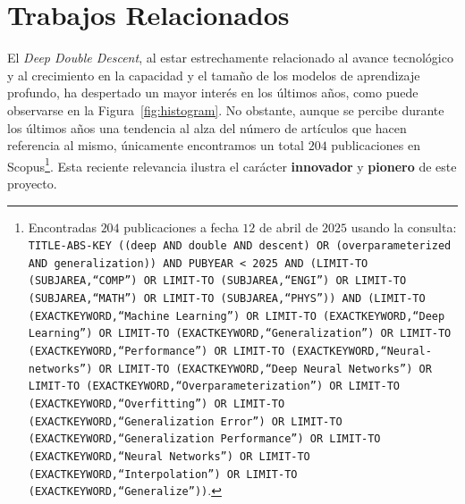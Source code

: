 
\chapter{Trabajos Relacionados}\label{sec:evolucion-ddd}

El \emph{Deep Double Descent}, al estar estrechamente relacionado al avance tecnológico y al crecimiento en la capacidad y el tamaño de los modelos de aprendizaje profundo, ha despertado un mayor interés en los últimos años, como puede observarse en la Figura~\ref{fig:histogram}. No obstante, aunque se percibe durante los últimos años una tendencia al alza del número de artículos que hacen referencia al mismo, únicamente encontramos un total $204$ publicaciones en Scopus\footnote{\label{nota:scopus}Encontradas $204$ publicaciones a fecha $12$ de abril de $2025$ usando la consulta:  
\texttt{TITLE-ABS-KEY ((deep AND double AND descent) OR (overparameterized AND generalization)) AND PUBYEAR < 2025 AND (LIMIT-TO (SUBJAREA,\textquotedblleft COMP\textquotedblright) OR LIMIT-TO (SUBJAREA,\textquotedblleft ENGI\textquotedblright) OR LIMIT-TO (SUBJAREA,\textquotedblleft MATH\textquotedblright) OR LIMIT-TO (SUBJAREA,\textquotedblleft PHYS\textquotedblright)) AND (LIMIT-TO (EXACTKEYWORD,\textquotedblleft Machine Learning\textquotedblright) OR LIMIT-TO (EXACTKEYWORD,\textquotedblleft Deep Learning\textquotedblright) OR LIMIT-TO (EXACTKEYWORD,\textquotedblleft Generalization\textquotedblright) OR LIMIT-TO (EXACTKEYWORD,\textquotedblleft Performance\textquotedblright) OR LIMIT-TO (EXACTKEYWORD,\textquotedblleft Neural-networks\textquotedblright) OR LIMIT-TO (EXACTKEYWORD,\textquotedblleft Deep Neural Networks\textquotedblright) OR LIMIT-TO (EXACTKEYWORD,\textquotedblleft Overparameterization\textquotedblright) OR LIMIT-TO (EXACTKEYWORD,\textquotedblleft Overfitting\textquotedblright) OR LIMIT-TO (EXACTKEYWORD,\textquotedblleft Generalization Error\textquotedblright) OR LIMIT-TO (EXACTKEYWORD,\textquotedblleft Generalization Performance\textquotedblright) OR LIMIT-TO (EXACTKEYWORD,\textquotedblleft Neural Networks\textquotedblright) OR LIMIT-TO (EXACTKEYWORD,\textquotedblleft Interpolation\textquotedblright) OR LIMIT-TO (EXACTKEYWORD,\textquotedblleft Generalize\textquotedblright))}.}. Esta reciente relevancia ilustra el carácter \textbf{innovador} y \textbf{pionero} de este proyecto.

